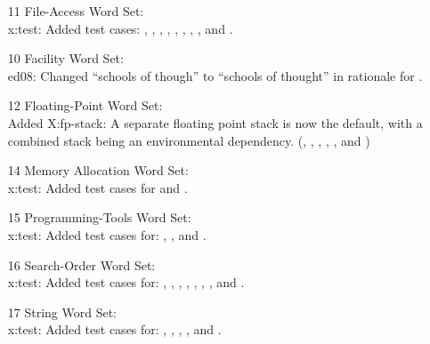 \begin{itemize}
	\item[11] File-Access Word Set: \\
		\textsf{x:test}: Added test cases:
		,
		, \linebreak
		,
		,
		, \linebreak
		,
		,
		,
		 and
		.

	\item[10] Facility Word Set: \\
		\textsf{ed08}: Changed ``schools of though'' to ``schools of
			thought'' in rationale for \linebreak
			.

	\item[12] Floating-Point Word Set: \\
		Added \textsf{X:fp-stack}:
		A separate floating point stack is now the default,
		with a combined stack being an environmental
		dependency.
		(,
		 ,
		 ,
		 ,
		 , and
		 )

	\item[14] Memory Allocation Word Set: \\
		\textsf{x:test}: Added test cases for
		 and .

	\item[15] Programming-Tools Word Set: \\
		\textsf{x:test}: Added test cases for:
			,
			, \linebreak
			 and
			.

	\item[16] Search-Order Word Set: \\
		\textsf{x:test}: Added test cases for:
		,
		,
		,
		,
		, \linebreak
		,
		,
		 and \linebreak
		.

	\item[17] String Word Set: \\
		\textsf{x:test}: Added test cases for:
		,
		,
		,
		,
		 and
		.


\end{itemize}
